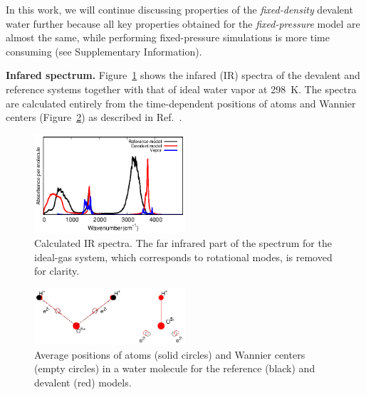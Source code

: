 \documentclass[journal=jacsat,manuscript=article]{achemso}
\begin{document}
In this work, we will continue discussing properties of the \emph{fixed-density} devalent water further because all key properties obtained for the \emph{fixed-pressure} model are almost the same, while performing fixed-pressure simulations is more time consuming (see Supplementary Information).


\textbf{Infared spectrum.} Figure~\ref{Fig:IR} shows the infared (IR) spectra of the devalent and reference systems together with that of ideal water vapor at 298~K. The spectra are calculated entirely from the time-dependent positions of atoms and Wannier centers (Figure~\ref{Fig:acoord}) as described in Ref.~.

\begin{figure}
\centering
\includegraphics[width=0.5\textwidth]{new_ir}
\caption{Calculated IR spectra. The far infrared part of the spectrum for the ideal-gas system, which corresponds to rotational modes, is removed for clarity. 
} \label{Fig:IR}
\end{figure}

\begin{figure}
\includegraphics[width=0.5\textwidth]{acoord}
\caption{Average positions of atoms (solid circles) and Wannier centers (empty circles) in a water molecule for the reference (black) and devalent (red) models. 
} \label{Fig:acoord}
\end{figure}
\end{document}

